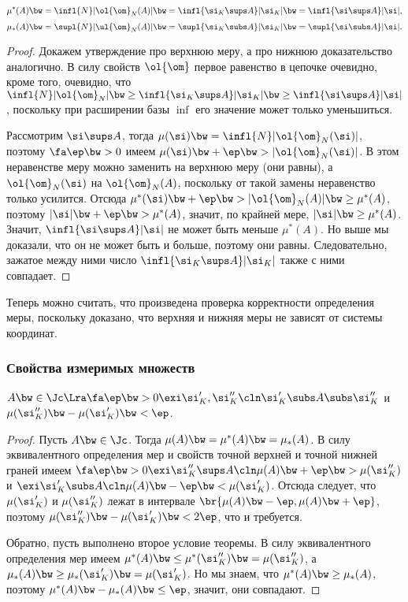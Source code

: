 \documentclass[a4paper]{article}
\begin{document}
\begin{theorem}
$$\mu^*(A) \bw= \infl{N}|\ol{\om}_N(A)| \bw= \infl{\si_K \sups A}|\si_K| \bw= \infl{\si \sups A}|\si|,$$
$$\mu_*(A) \bw= \supl{N}|\ul{\om}_N(A)| \bw= \supl{\si_K \subs A}|\si_K| \bw= \supl{\si \subs A}|\si|.$$
\end{theorem}
\begin{proof}
Докажем утверждение про верхнюю меру, а про нижнюю доказательство аналогично. В силу свойств
$\ol{\om}$ первое равенство в цепочке очевидно, кроме того, очевидно, что $\infl{N}|\ol{\om}_N| \bw\ge
\infl{\si_K \sups A}|\si_K| \bw\ge \infl{\si \sups A}|\si|$, поскольку при расширении базы $\inf$ его
значение может только уменьшиться.

Рассмотрим $\si \sups A$, тогда $\mu(\si) \bw= \infl{N}|\ol{\om}_N(\si)|$, поэтому $\fa \ep \bw> 0$ имеем
$\mu(\si) \bw+ \ep \bw> |\ol{\om}_N(\si)|$. В этом неравенстве меру можно заменить на верхнюю меру (они
равны), а $\ol{\om}_N(\si)$ на $\ol{\om}_N(A)$, поскольку от такой замены неравенство только
усилится. Отсюда $\mu^*(\si) \bw+ \ep \bw> |\ol{\om}_N(A)| \bw\ge \mu^*(A)$, поэтому $|\si| \bw+ \ep \bw>
\mu^*(A)$, значит, по крайней мере, $|\si| \bw\ge \mu^*(A)$. Значит, $\infl{\si \sups A} |\si|$ не
может быть меньше $\mu^*(A)$. Но выше мы доказали, что он не может быть и больше, поэтому они
равны. Следовательно, зажатое между ними число $\infl{\si_K\sups A}|\si_K|$ также с ними совпадает.
\end{proof}

\begin{note}
Теперь можно считать, что произведена проверка корректности определения меры, поскольку доказано,
что верхняя и нижняя меры не зависят от системы координат.
\end{note}

\subsubsection{Свойства измеримых множеств}

\begin{theorem}
$A \bw\in \Jc \Lra \fa \ep \bw> 0 \exi \si_K', \si_K''\cln \si_K' \subs A \subs \si_K''$ и $\mu(\si_K'')
\bw- \mu(\si_K') \bw< \ep$.
\end{theorem}
\begin{proof}
Пусть $A\bw\in \Jc$. Тогда $\mu(A) \bw= \mu^*(A) \bw= \mu_*(A)$. В силу эквивалентного определения мер и
свойств точной верхней и точной нижней граней имеем $\fa \ep \bw> 0 \exi \si_K'' \sups A\cln \mu(A) \bw+
\ep \bw> \mu(\si_K'')$ и $\exi \si_K' \subs A\cln \mu(A) \bw- \ep \bw< \mu(\si_K')$. Отсюда следует, что
$\mu(\si_K')$ и $\mu(\si_K'')$ лежат в интервале $\br{\mu(A) \bw-\ep, \mu(A)\bw+\ep}$, поэтому
$\mu(\si_K'') \bw- \mu(\si_K') \bw< 2\ep$, что и требуется.

Обратно, пусть выполнено второе условие теоремы. В силу эквивалентного определения мер имеем
$\mu^*(A) \bw\le \mu^*(\si_K'')\bw=\mu(\si_K'')$, а $\mu_*(A) \bw\ge \mu_*(\si_K')\bw=\mu(\si_K')$. Но мы
знаем, что $\mu^*(A) \bw\ge \mu_*(A)$, поэтому $\mu^*(A) \bw-\mu_*(A) \bw\le \ep$, значит, они совпадают.
\end{proof}
\end{document}
